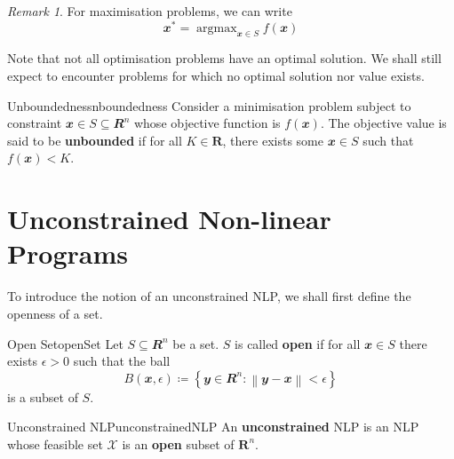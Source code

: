 \documentclass[math, code]{amznotes}
\theoremstyle{remark}
\newtheorem*{remark}{Remark}
\DeclareMathOperator*{\argmax}{argmax}
\begin{document}
\begin{notebox}
    \begin{remark}
        For maximisation problems, we can write
        \begin{equation*}
            \mathbfit{x}^* = \argmax_{\mathbfit{x} \in S} f(\mathbfit{x})
        \end{equation*}
    \end{remark}
\end{notebox}
Note that not all optimisation problems have an optimal solution. We shall still expect to encounter problems for which no optimal solution nor value exists.
\begin{dfnbox}{Unboundedness}{nboundedness}
    Consider a minimisation problem subject to constraint $\mathbfit{x} \in S \subseteq \mathbfit{R}^n$ whose objective function is $f(\mathbfit{x})$. The objective value is said to be {\color{red} \textbf{unbounded}} if for all $K \in \mathbf{R}$, there exists some $\mathbfit{x} \in S$ such that $f(\mathbfit{x}) < K$.
\end{dfnbox}
\section{Unconstrained Non-linear Programs}
To introduce the notion of an unconstrained NLP, we shall first define the openness of a set.
\begin{dfnbox}{Open Set}{openSet}
    Let $S \subseteq \mathbfit{R}^n$ be a set. $S$ is called {\color{red} \textbf{open}} if for all $\mathbfit{x} \in S$ there exists $\epsilon > 0$ such that the ball
    \begin{equation*}
        B(\mathbfit{x}, \epsilon) \coloneqq \left\{\mathbfit{y} \in \mathbfit{R}^n \colon \left\lVert \mathbfit{y - x} \right\rVert < \epsilon\right\}
    \end{equation*}
    is a subset of $S$.
\end{dfnbox}
\begin{dfnbox}{Unconstrained NLP}{unconstrainedNLP}
    An {\color{red} \textbf{unconstrained}} NLP is an NLP whose feasible set $\mathcal{X}$ is an {\color{red} \textbf{open}} subset of $\mathbf{R}^n$.
\end{dfnbox}
\end{document}
